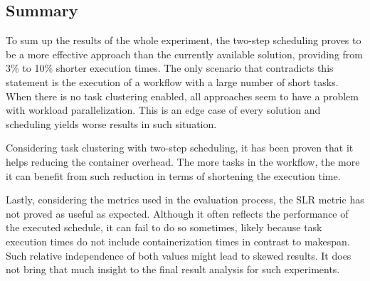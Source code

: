 \subsection{Summary}

To sum up the results of the whole experiment, the two-step scheduling proves to be a more effective approach than the currently available solution, providing from 3\% to 10\% shorter execution times.
The only scenario that contradicts this statement is the execution of a workflow with a large number of short tasks.
When there is no task clustering enabled, all approaches seem to have a problem with workload parallelization.
This is an edge case of every solution and scheduling yields worse results in such situation.


Considering task clustering with two-step scheduling, it has been proven that it helps reducing the container overhead.
The more tasks in the workflow, the more it can benefit from such reduction in terms of shortening the execution time.


\clearpage

Lastly, considering the metrics used in the evaluation process, the SLR metric has not proved as useful as expected.
Although it often reflects the performance of the executed schedule, it can fail to do so sometimes, likely because task execution times do not include containerization times in contrast to makespan.
Such relative independence of both values might lead to skewed results.  
It does not bring that much insight to the final result analysis for such experiments.





